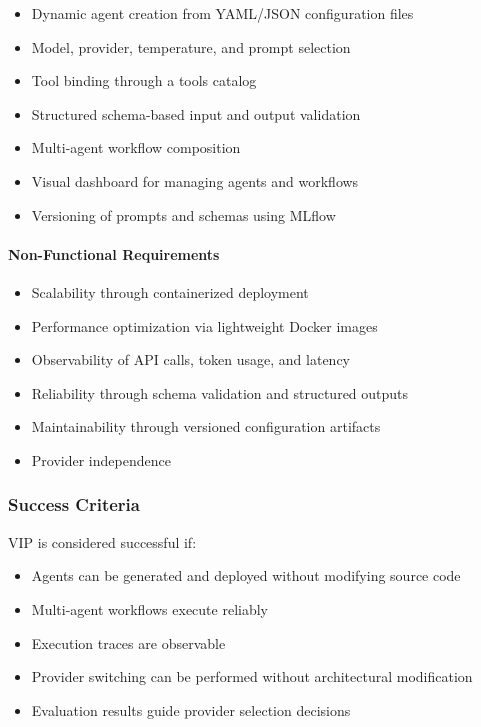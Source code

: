 \begin{itemize}
    \item Dynamic agent creation from YAML/JSON configuration files
    \item Model, provider, temperature, and prompt selection
    \item Tool binding through a tools catalog
    \item Structured schema-based input and output validation
    \item Multi-agent workflow composition
    \item Visual dashboard for managing agents and workflows
    \item Versioning of prompts and schemas using MLflow
\end{itemize}

\paragraph{Non-Functional Requirements}

\begin{itemize}
    \item Scalability through containerized deployment
    \item Performance optimization via lightweight Docker images
    \item Observability of API calls, token usage, and latency
    \item Reliability through schema validation and structured outputs
    \item Maintainability through versioned configuration artifacts
    \item Provider independence
\end{itemize}

\setcounter{secnumdepth}{3}
\setcounter{tocdepth}{3}

\subsubsection{Success Criteria}

VIP is considered successful if:

\begin{itemize}
    \item Agents can be generated and deployed without modifying source code
    \item Multi-agent workflows execute reliably
    \item Execution traces are observable
    \item Provider switching can be performed without architectural modification
    \item Evaluation results guide provider selection decisions
\end{itemize}

